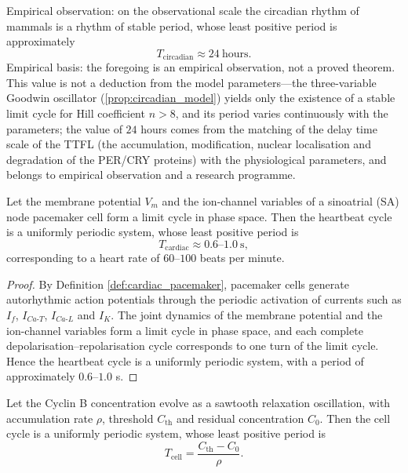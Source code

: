\begin{remark}\label{lem:circadian_periodic}
Empirical observation: on the observational scale the circadian rhythm of mammals is a rhythm of stable period, whose least positive period is approximately
\[
T_{\text{circadian}} \approx 24\ \text{hours}.
\]
Empirical basis: the foregoing is an empirical observation, not a proved theorem. This value is not a deduction from the model parameters---the three-variable Goodwin oscillator (\cref{prop:circadian_model}) yields only the existence of a stable limit cycle for Hill coefficient $n > 8$, and its period varies continuously with the parameters; the value of $24$ hours comes from the matching of the delay time scale of the TTFL (the accumulation, modification, nuclear localisation and degradation of the PER/CRY proteins) with the physiological parameters, and belongs to empirical observation and a research programme.
\end{remark}

\begin{lemma}\label{lem:cardiac_periodic}
Let the membrane potential $V_m$ and the ion-channel variables of a sinoatrial (SA) node pacemaker cell form a limit cycle in phase space. Then the heartbeat cycle is a uniformly periodic system, whose least positive period is
\[
T_{\text{cardiac}} \approx 0.6\text{--}1.0\ \text{s},
\]
corresponding to a heart rate of $60$--$100$ beats per minute.
\end{lemma}

\begin{proof}
By Definition \ref{def:cardiac_pacemaker}, pacemaker cells generate autorhythmic action potentials through the periodic activation of currents such as $I_f$, $I_{Ca\text{-}T}$, $I_{Ca\text{-}L}$ and $I_K$. The joint dynamics of the membrane potential and the ion-channel variables form a limit cycle in phase space, and each complete depolarisation--repolarisation cycle corresponds to one turn of the limit cycle. Hence the heartbeat cycle is a uniformly periodic system, with a period of approximately $0.6$--$1.0$ s.
\end{proof}

\begin{lemma}\label{lem:cell_cycle_periodic}
Let the Cyclin B concentration evolve as a sawtooth relaxation oscillation, with accumulation rate $\rho$, threshold $C_{\text{th}}$ and residual concentration $C_0$. Then the cell cycle is a uniformly periodic system, whose least positive period is
\[
T_{\text{cell}} = \frac{C_{\text{th}} - C_0}{\rho}.
\]
\end{lemma}

